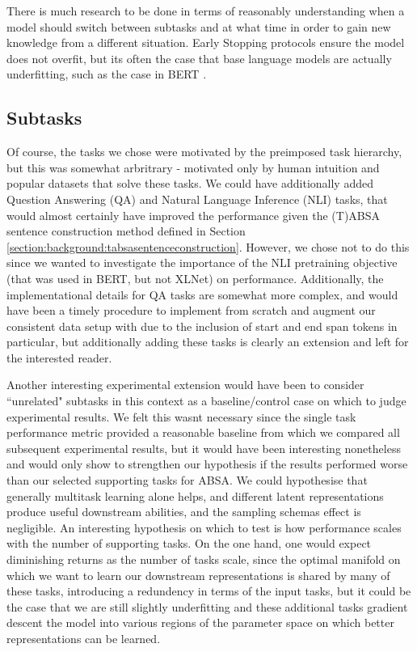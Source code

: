 There is much research to be done in terms of reasonably understanding when a model should switch between subtasks and at what time in order to gain new knowledge from a different situation. Early Stopping protocols ensure the model does not overfit, but its often the case that base language models are actually underfitting, such as the case in BERT \cite{Devlin2018}.

\subsection{Subtasks} \label{section:extensions:subtasks}
Of course, the tasks we chose were motivated by the preimposed task hierarchy, but this was somewhat arbritrary - motivated only by human intuition and popular datasets that solve these tasks. We could have additionally added Question Answering (QA) and Natural Language Inference (NLI) tasks, that would almost certainly have improved the performance given the (T)ABSA sentence construction method defined in Section \ref{section:background:tabsasentenceconstruction}. However, we chose not to do this since we wanted to investigate the importance of the NLI pretraining objective (that was used in BERT, but not XLNet) on performance. Additionally, the implementational details for QA tasks are somewhat more complex, and would have been a timely procedure to implement from scratch and augment our consistent data setup with due to the inclusion of start and end span tokens in particular, but additionally adding these tasks is clearly an extension and left for the interested reader.

Another interesting experimental extension would have been to consider ``unrelated" subtasks in this context as a baseline/control case on which to judge experimental results. We felt this wasnt necessary since the single task performance metric provided a reasonable baseline from which we compared all subsequent experimental results, but it would have been interesting nonetheless and would only show to strengthen our hypothesis if the results performed worse than our selected supporting tasks for ABSA. We could hypothesise that generally multitask learning alone helps, and different latent representations produce useful downstream abilities, and the sampling schemas effect is negligible. An interesting hypothesis on which to test is how performance scales with the number of supporting tasks. On the one hand, one would expect diminishing returns as the number of tasks scale, since the optimal manifold on which we want to learn our downstream representations is shared by many of these tasks, introducing a redundency in terms of the input tasks, but it could be the case that we are still slightly underfitting and these additional tasks gradient descent the model into various regions of the parameter space on which better representations can be learned.


